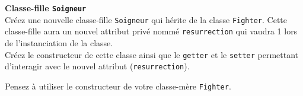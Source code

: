 % 

\begin{Exercice}[5 minutes] \textbf{Classe-fille \lstinline{Soigneur}} \\
Créez une nouvelle classe-fille \lstinline{Soigneur} qui hérite de la classe \lstinline{Fighter}. Cette classe-fille aura un nouvel attribut privé nommé \lstinline{resurrection} qui vaudra 1 lors de l'instanciation de la classe. \\

Créez le constructeur de cette classe ainsi que le \lstinline{getter} et le \lstinline{setter} permettant d'interagir avec le nouvel attribut (\lstinline{resurrection}). \\

\begin{conseil}
Pensez à utiliser le constructeur de votre classe-mère \lstinline{Fighter}.
\end{conseil}

\begin{solution}
	
\end{solution}

\end{Exercice}

